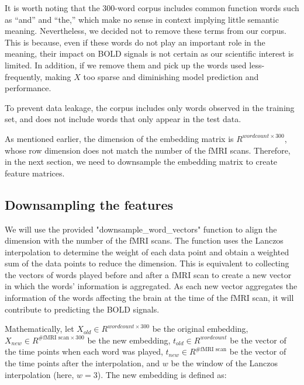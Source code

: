 \documentclass[12pt,letterpaper]{article}
\begin{document}
It is worth noting that the 300-word corpus includes common function words such as “and” and “the,” which make no sense in context implying little semantic meaning. Nevertheless, we decided not to remove these terms from our corpus. This is because, even if these words do not play an important role in the meaning, their impact on BOLD signals is not certain as our scientific interest is limited. In addition, if we remove them and pick up the words used less-frequently, making $X$ too sparse and diminishing model prediction and performance. 

To prevent data leakage, the corpus includes only words observed in the training set, and does not include words that only appear in the test data.

As mentioned earlier, the dimension of the embedding matrix is $R^{wordcount \times 300}$, whose row dimension does not match the number of the fMRI scans. Therefore, in the next section, we need to downsample the embedding matrix to create feature matrices.

\subsection{Downsampling the features}

We will use the provided "downsample\_word\_vectors" function to align the dimension with the number of the fMRI scans. The function uses the Lanczos interpolation to determine the weight of each data point and obtain a weighted sum of the data points to reduce the dimension. This is equivalent to collecting the vectors of words played before and after a fMRI scan to create a new vector in which the words' information is aggregated. As each new vector aggregates the information of the words affecting the brain at the time of the fMRI scan, it will contribute to predicting the BOLD signals.

Mathematically, let $X_{old} \in R^{wordcount \times 300}$ be the original embedding, $X_{new} \in R^{\#\text{fMRI scan} \times 300}$ be the new embedding, $t_{old} \in R^{wordcount}$ be the vector of the time points when each word was played, $t_{new} \in R^{\#\text{fMRI scan}}$ be the vector of the time points after the interpolation, and $w$ be the window of the Lanczos interpolation (here, $w = 3$). The new embedding is defined as:
\end{document}
